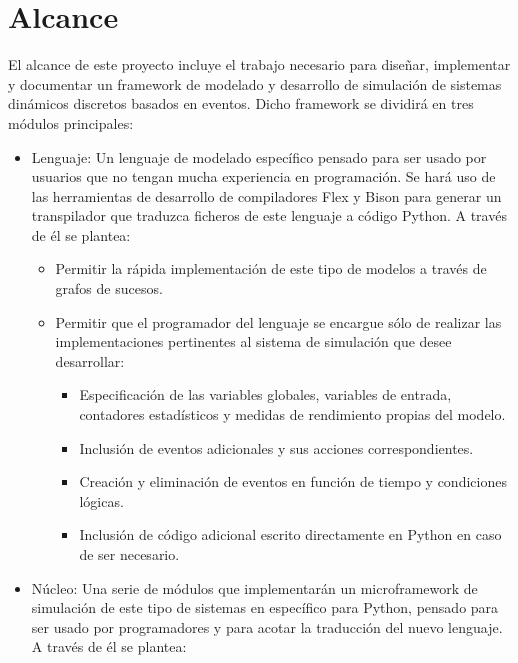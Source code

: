 \section{Alcance}\label{sec:alcance}

El alcance de este proyecto incluye el trabajo necesario para diseñar,
implementar y documentar un framework de modelado y desarrollo de simulación de
sistemas dinámicos discretos basados en eventos. Dicho framework se dividirá en
tres módulos principales:
\begin{itemize}
    \item Lenguaje: Un lenguaje de modelado específico pensado para ser usado
    por usuarios que no tengan mucha experiencia en programación. Se hará uso de
    las herramientas de desarrollo de compiladores Flex y Bison para generar un
    transpilador que traduzca ficheros de este lenguaje a código Python. A
    través de él se plantea:
    \begin{itemize}
        \item Permitir la rápida implementación de este tipo de modelos a través
        de grafos de sucesos.
        \item Permitir que el programador del lenguaje se encargue sólo de
        realizar las implementaciones pertinentes al sistema de simulación que
        desee desarrollar:
        \begin{itemize}
            \item Especificación de las variables globales, variables de
            entrada, contadores estadísticos y medidas de rendimiento propias
            del modelo.
            \item Inclusión de eventos adicionales y sus acciones
            correspondientes.
            \item Creación y eliminación de eventos en función de tiempo y
            condiciones lógicas.
            \item Inclusión de código adicional escrito directamente en Python
            en caso de ser necesario.
        \end{itemize}
    \end{itemize}
    \item Núcleo: Una serie de módulos que implementarán un microframework de
    simulación de este tipo de sistemas en específico para Python, pensado para
    ser usado por programadores y para acotar la traducción del nuevo lenguaje.
    A través de él se plantea:
    \begin{itemize}

\end{itemize}
\end{itemize}

